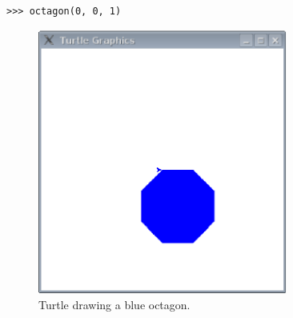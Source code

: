 \begin{listing}
\begin{verbatim}
>>> octagon(0, 0, 1)
\end{verbatim}
\end{listing}

\begin{figure}
\begin{center}
\includegraphics[width=82mm]{eps/figure49.eps}
\end{center}
\caption{Turtle drawing a blue octagon.}\label{fig49}
\end{figure}
\newpage
